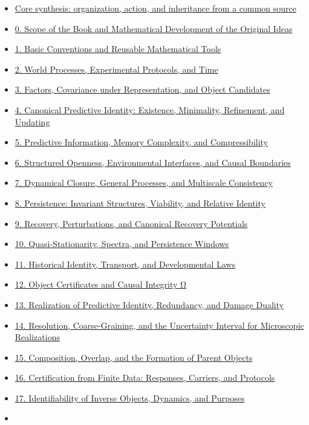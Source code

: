 \documentclass[
  english,
  11pt,
  oneside]{book}
\begin{document}
\begin{itemize}
\item
  \hyperref[core-theory]{Core synthesis: organization, action, and inheritance from a common source}
\item
  \hyperref[ch-0]{0. Scope of the Book and Mathematical Development of the Original Ideas}
\item
  \hyperref[ch-1]{1. Basic Conventions and Reusable Mathematical Tools}
\item
  \hyperref[ch-2]{2. World Processes, Experimental Protocols, and Time}
\item
  \hyperref[ch-3]{3. Factors, Covariance under Representation, and Object Candidates}
\item
  \hyperref[ch-4]{4. Canonical Predictive Identity: Existence, Minimality, Refinement, and Updating}
\item
  \hyperref[ch-5]{5. Predictive Information, Memory Complexity, and Compressibility}
\item
  \hyperref[ch-6]{6. Structured Openness, Environmental Interfaces, and Causal Boundaries}
\item
  \hyperref[ch-7]{7. Dynamical Closure, General Processes, and Multiscale Consistency}
\item
  \hyperref[ch-8]{8. Persistence: Invariant Structures, Viability, and Relative Identity}
\item
  \hyperref[ch-9]{9. Recovery, Perturbations, and Canonical Recovery Potentials}
\item
  \hyperref[ch-10]{10. Quasi-Stationarity, Spectra, and Persistence Windows}
\item
  \hyperref[ch-11]{11. Historical Identity, Transport, and Developmental Laws}
\item
  \hyperref[ch-12]{12. Object Certificates and Causal Integrity Ω}
\item
  \hyperref[ch-13]{13. Realization of Predictive Identity, Redundancy, and Damage Duality}
\item
  \hyperref[ch-14]{14. Resolution, Coarse-Graining, and the Uncertainty Interval for Microscopic Realizations}
\item
  \hyperref[ch-15]{15. Composition, Overlap, and the Formation of Parent Objects}
\item
  \hyperref[ch-16]{16. Certification from Finite Data: Responses, Carriers, and Protocols}
\item
  \hyperref[ch-17]{17. Identifiability of Inverse Objects, Dynamics, and Purposes}
\item

\end{itemize}
\end{document}
